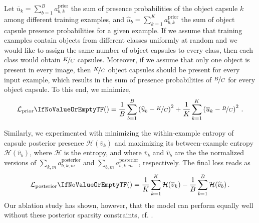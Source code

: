 \begin{description}[leftmargin=\parindent]
	\item[Prior sparsity]
	Let $\overline{u}_k = \sum_{b=1}^B a^\mathrm{prior}_{b,k}$ the sum of presence probabilities of the object capsule $k$ among different training examples, and $\widehat{u}_b = \sum_{k=1}^K a^\mathrm{prior}_{b,k}$ the sum of object capsule presence probabilities for a given example.
	If we assume that training examples contain objects from different classes uniformly at random and we would like to assign the same number of object capsules to every class, then each class would obtain $\nicefrac{K}{C}$ capsules.
	Moreover, if we assume that only one object is present in every image, then $\nicefrac{K}{C}$ object capsules should be present for every input example, which results in the sum of presence probabilities of $\nicefrac{B}{C}$ for every object capsule.
	To this end, we minimize, 
	\begin{equation}
	\loss[\mathrm{prior}]{} = 
	\frac{1}{B} \sum_{b=1}^B \left(\widehat{u}_b  - \nicefrac{K}{C} 
	\right)^2
	+
	\frac{1}{K} \sum_{k=1}^K \left(\overline{u}_k  - \nicefrac{B}{C} \right)^2\,. \label{eq:prior_sparsity}
	\end{equation}
	\item[Posterior Sparsity]
	Similarly, we experimented with minimizing the within-example entropy of capsule posterior presence $\mathcal{H}(\overline{v}_k)$ and maximizing its between-example entropy $\mathcal{H}(\widehat{v}_b)$, where $\mathcal{H}$ is the entropy, and where $\overline{v}_k$ and $\widehat{v}_b$ are the the normalized versions of  $\sum_{k,m} a^\mathrm{posterior}_{b,k,m}$
	and $\sum_{b,m} a^\mathrm{posterior}_{b,k,m}$, respectively.
	The final loss reads as
	\begin{equation}
	\loss[\mathrm{posterior}]{} = \frac{1}{K} \sum_{k=1}^K \mathcal{H}(\overline{v}_k) - \frac{1}{B} \sum_{b=1}^B \mathcal{H}(\widehat{v}_b)\,. \label{eq:posterior_sparsity}
	\end{equation}
	Our ablation study has shown, however, that the model can perform equally well without these posterior sparsity constraints, cf. .
\end{description}
